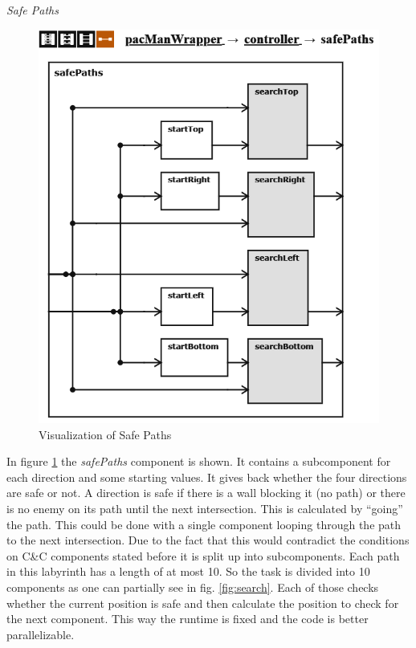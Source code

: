 \emph{Safe Paths} \newline
\begin{figure}
	\caption{Visualization of Safe Paths}
	\label{fig:safePaths}
	\centering
	\includegraphics[scale=0.75]{pictures/Pacman/safePaths.png}
\end{figure}
In figure \ref{fig:safePaths} the \textit{safePaths} component is shown. It contains a subcomponent for each direction and some starting values. It gives back whether the four directions are safe or not. A direction is safe if there is a wall blocking it (no path) or there is no enemy on its path until the next intersection. This is calculated by ``going'' the path. This could be done with a single component looping through the path to the next intersection. Due to the fact that this would contradict the conditions on C\&C components stated before it is split up into subcomponents. Each path in this labyrinth has a length of at most 10. So the task is divided into 10 components as one can partially see in fig. \ref{fig:search}. Each of those checks whether the current position is safe and then calculate the position to check for the next component. This way the runtime is fixed and the code is better parallelizable.
